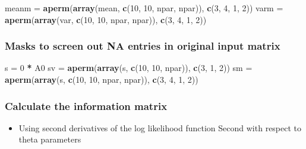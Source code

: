 \documentclass[]{article}
\newenvironment{Shaded}{\begin{snugshade}}{\end{snugshade}}
\newcommand{\DecValTok}[1]{\textcolor[rgb]{0.00,0.00,0.81}{#1}}
\newcommand{\KeywordTok}[1]{\textcolor[rgb]{0.13,0.29,0.53}{\textbf{#1}}}
\newcommand{\NormalTok}[1]{#1}
\newcommand{\OperatorTok}[1]{\textcolor[rgb]{0.81,0.36,0.00}{\textbf{#1}}}
\newcommand{\StringTok}[1]{\textcolor[rgb]{0.31,0.60,0.02}{#1}}
\providecommand{\tightlist}{%
  \setlength{\itemsep}{0pt}\setlength{\parskip}{0pt}}
\begin{document}
\begin{Shaded}
\begin{Highlighting}[]
\NormalTok{meanm =}\StringTok{ }\KeywordTok{aperm}\NormalTok{(}\KeywordTok{array}\NormalTok{(mean, }\KeywordTok{c}\NormalTok{(}\DecValTok{10}\NormalTok{, }\DecValTok{10}\NormalTok{, npar, npar)), }\KeywordTok{c}\NormalTok{(}\DecValTok{3}\NormalTok{, }\DecValTok{4}\NormalTok{, }\DecValTok{1}\NormalTok{, }\DecValTok{2}\NormalTok{))}
\NormalTok{varm =}\StringTok{ }\KeywordTok{aperm}\NormalTok{(}\KeywordTok{array}\NormalTok{(var, }\KeywordTok{c}\NormalTok{(}\DecValTok{10}\NormalTok{, }\DecValTok{10}\NormalTok{, npar, npar)), }\KeywordTok{c}\NormalTok{(}\DecValTok{3}\NormalTok{, }\DecValTok{4}\NormalTok{, }\DecValTok{1}\NormalTok{, }\DecValTok{2}\NormalTok{))}
\end{Highlighting}
\end{Shaded}

\hypertarget{masks-to-screen-out-na-entries-in-original-input-matrix}{%
\subsubsection{Masks to screen out NA entries in original input
matrix}\label{masks-to-screen-out-na-entries-in-original-input-matrix}}

\begin{Shaded}
\begin{Highlighting}[]
\NormalTok{s =}\StringTok{ }\DecValTok{0} \OperatorTok{*}\StringTok{ }\NormalTok{A0}
\NormalTok{sv =}\StringTok{ }\KeywordTok{aperm}\NormalTok{(}\KeywordTok{array}\NormalTok{(s, }\KeywordTok{c}\NormalTok{(}\DecValTok{10}\NormalTok{, }\DecValTok{10}\NormalTok{, npar)), }\KeywordTok{c}\NormalTok{(}\DecValTok{3}\NormalTok{, }\DecValTok{1}\NormalTok{, }\DecValTok{2}\NormalTok{))}
\NormalTok{sm =}\StringTok{ }\KeywordTok{aperm}\NormalTok{(}\KeywordTok{array}\NormalTok{(s, }\KeywordTok{c}\NormalTok{(}\DecValTok{10}\NormalTok{, }\DecValTok{10}\NormalTok{, npar, npar)), }\KeywordTok{c}\NormalTok{(}\DecValTok{3}\NormalTok{, }\DecValTok{4}\NormalTok{, }\DecValTok{1}\NormalTok{, }\DecValTok{2}\NormalTok{))}
\end{Highlighting}
\end{Shaded}

\hypertarget{calculate-the-information-matrix}{%
\subsubsection{Calculate the information
matrix}\label{calculate-the-information-matrix}}

\begin{itemize}
\tightlist
\item
  Using second derivatives of the log likelihood function Second with
  respect to theta parameters
\end{itemize}
\end{document}
